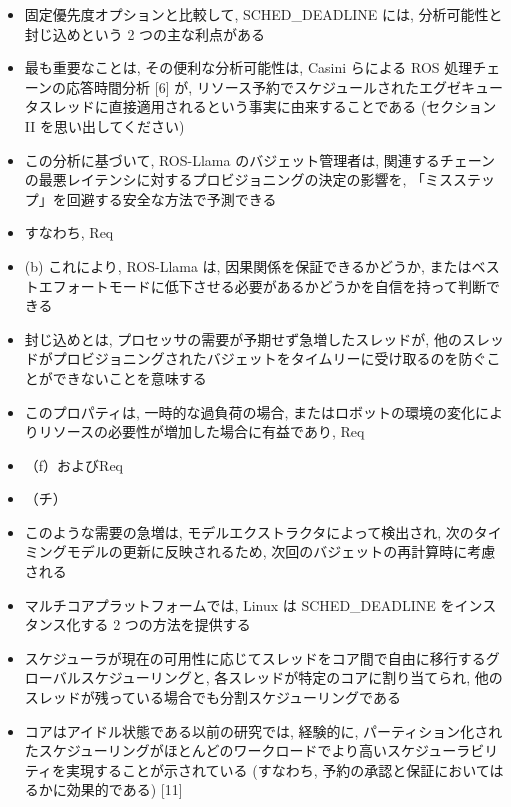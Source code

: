 \begin{frame}{}
    \begin{itemize}
        \item 固定優先度オプションと比較して, SCHED\_DEADLINE には, 分析可能性と封じ込めという 2 つの主な利点がある
        \item 最も重要なことは, その便利な分析可能性は, Casini らによる ROS 処理チェーンの応答時間分析 [6] が, リソース予約でスケジュールされたエグゼキュータスレッドに直接適用されるという事実に由来することである (セクション II を思い出してください)
        \item この分析に基づいて, ROS-Llama のバジェット管理者は, 関連するチェーンの最悪レイテンシに対するプロビジョニングの決定の影響を, 「ミスステップ」を回避する安全な方法で予測できる
        \item すなわち, Req
        \item (b) これにより, ROS-Llama は, 因果関係を保証できるかどうか, またはベストエフォートモードに低下させる必要があるかどうかを自信を持って判断できる
    \end{itemize}
\end{frame}

\begin{frame}{}
    \begin{itemize}
        \item 封じ込めとは, プロセッサの需要が予期せず急増したスレッドが, 他のスレッドがプロビジョニングされたバジェットをタイムリーに受け取るのを防ぐことができないことを意味する
        \item このプロパティは, 一時的な過負荷の場合, またはロボットの環境の変化によりリソースの必要性が増加した場合に有益であり, Req
        \item （f）およびReq
        \item （チ）
        \item このような需要の急増は, モデルエクストラクタによって検出され, 次のタイミングモデルの更新に反映されるため, 次回のバジェットの再計算時に考慮される
    \end{itemize}
\end{frame}

\begin{frame}{}
    \begin{itemize}
        \item マルチコアプラットフォームでは, Linux は SCHED\_DEADLINE をインスタンス化する 2 つの方法を提供する
        \item スケジューラが現在の可用性に応じてスレッドをコア間で自由に移行するグローバルスケジューリングと, 各スレッドが特定のコアに割り当てられ, 他のスレッドが残っている場合でも分割スケジューリングである
        \item コアはアイドル状態である以前の研究では, 経験的に, パーティション化されたスケジューリングがほとんどのワークロードでより高いスケジューラビリティを実現することが示されている (すなわち, 予約の承認と保証においてはるかに効果的である) [11]
    \end{itemize}
\end{frame}

